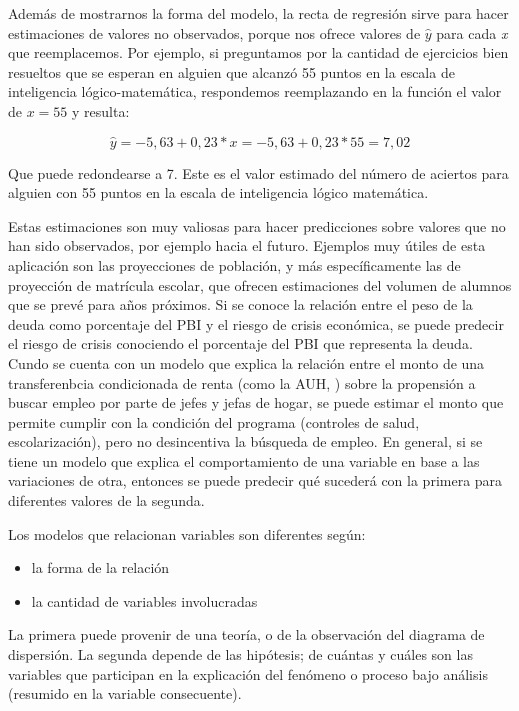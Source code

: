 \documentclass[]{book}
\begin{document}
Además de mostrarnos la forma del modelo, la recta de regresión sirve
para hacer estimaciones de valores no observados, porque nos ofrece
valores de \(\widehat{y}\) para cada \emph{x} que reemplacemos. Por ejemplo, si
preguntamos por la cantidad de ejercicios bien resueltos que se esperan
en alguien que alcanzó 55 puntos en la escala de inteligencia
lógico-matemática, respondemos reemplazando en la función el valor de
\(x=55\) y resulta:

\[\widehat{y} = - 5,63 + 0,23*x = - 5,63 + 0,23*55 = 7,02\]

Que puede redondearse a 7. Este es el valor estimado del número de
aciertos para alguien con 55 puntos en la escala de inteligencia lógico
matemática.

Estas estimaciones son muy valiosas para hacer predicciones sobre
valores que no han sido observados, por ejemplo hacia el futuro.
Ejemplos muy útiles de esta aplicación son las proyecciones de
población, y más específicamente las de proyección de matrícula escolar, que ofrecen estimaciones del volumen de alumnos que se prevé para años próximos. Si se conoce la relación entre el peso de la deuda como porcentaje del PBI y el riesgo de crisis económica, se puede predecir el riesgo de crisis conociendo el porcentaje del PBI que representa la deuda. Cundo se cuenta con un modelo que explica la relación entre el monto de una transferenbcia condicionada de renta (como la AUH, ) sobre la propensión a buscar empleo por parte de jefes y jefas de hogar, se puede estimar el monto que permite cumplir con la condición del programa (controles de salud, escolarización), pero no desincentiva la búsqueda de empleo. En general, si se tiene un modelo que explica el comportamiento de una variable en base a las variaciones de otra, entonces se puede predecir qué sucederá con la primera para diferentes valores de la segunda.

Los modelos que relacionan variables son diferentes según:

\begin{itemize}
\item
  la forma de la relación
\item
  la cantidad de variables involucradas
\end{itemize}

La primera puede provenir de una teoría, o de la observación del diagrama de dispersión. La segunda depende de las hipótesis; de cuántas y cuáles son las variables que participan en la explicación del fenómeno o proceso bajo análisis (resumido en la variable consecuente).
\end{document}

